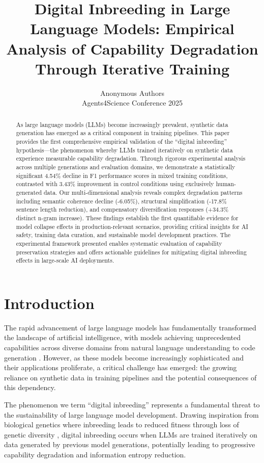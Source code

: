 \documentclass{article}
\title{Digital Inbreeding in Large Language Models: Empirical Analysis of Capability Degradation Through Iterative Training}
\author{%
  Anonymous Authors\\
  Agents4Science Conference 2025\\
}
\begin{document}
\maketitle

\begin{abstract}
As large language models (LLMs) become increasingly prevalent, synthetic data generation has emerged as a critical component in training pipelines. This paper provides the first comprehensive empirical validation of the ``digital inbreeding'' hypothesis—the phenomenon whereby LLMs trained iteratively on synthetic data experience measurable capability degradation. Through rigorous experimental analysis across multiple generations and evaluation domains, we demonstrate a statistically significant 4.54\% decline in F1 performance scores in mixed training conditions, contrasted with 3.43\% improvement in control conditions using exclusively human-generated data. Our multi-dimensional analysis reveals complex degradation patterns including semantic coherence decline (-6.05\%), structural simplification (-17.8\% sentence length reduction), and compensatory diversification responses (+34.3\% distinct n-gram increase). These findings establish the first quantifiable evidence for model collapse effects in production-relevant scenarios, providing critical insights for AI safety, training data curation, and sustainable model development practices. The experimental framework presented enables systematic evaluation of capability preservation strategies and offers actionable guidelines for mitigating digital inbreeding effects in large-scale AI deployments.
\end{abstract}

\section{Introduction}

The rapid advancement of large language models has fundamentally transformed the landscape of artificial intelligence, with models achieving unprecedented capabilities across diverse domains from natural language understanding to code generation \citep{brown2020language, chowdhery2022palm, touvron2023llama}. However, as these models become increasingly sophisticated and their applications proliferate, a critical challenge has emerged: the growing reliance on synthetic data in training pipelines and the potential consequences of this dependency.

The phenomenon we term ``digital inbreeding'' represents a fundamental threat to the sustainability of large language model development. Drawing inspiration from biological genetics where inbreeding leads to reduced fitness through loss of genetic diversity \citep{charlesworth2009fundamental}, digital inbreeding occurs when LLMs are trained iteratively on data generated by previous model generations, potentially leading to progressive capability degradation and information entropy reduction.
\end{document}
